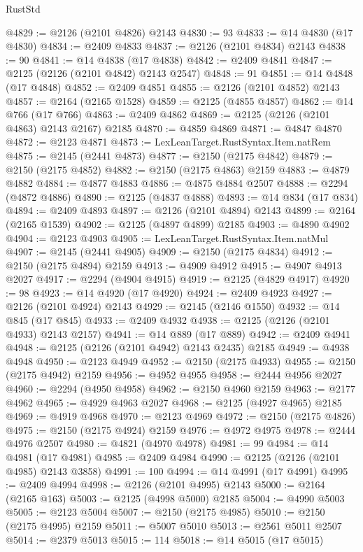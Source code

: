 \begin{lexlean}{RustStd}
\begin{coremodule}
@4829 := @2126 (@2101 @4826) @2143
@4830 := 93
@4833 := @14 @4830 (@17 @4830)
@4834 := @2409 @4833
@4837 := @2126 (@2101 @4834) @2143
@4838 := 90
@4841 := @14 @4838 (@17 @4838)
@4842 := @2409 @4841
@4847 := @2125 (@2126 (@2101 @4842) @2143 @2547)
@4848 := 91
@4851 := @14 @4848 (@17 @4848)
@4852 := @2409 @4851
@4855 := @2126 (@2101 @4852) @2143
@4857 := @2164 (@2165 @1528)
@4859 := @2125 (@4855 @4857)
@4862 := @14 @766 (@17 @766)
@4863 := @2409 @4862
@4869 := @2125 (@2126 (@2101 @4863) @2143 @2167) @2185
@4870 := @4859 @4869
@4871 := @4847 @4870
@4872 := @2123 @4871
@4873 := LexLeanTarget.RustSyntax.Item.natRem
@4875 := @2145 (@2441 @4873)
@4877 := @2150 (@2175 @4842)
@4879 := @2150 (@2175 @4852)
@4882 := @2150 (@2175 @4863) @2159
@4883 := @4879 @4882
@4884 := @4877 @4883
@4886 := @4875 @4884 @2507
@4888 := @2294 (@4872 @4886)
@4890 := @2125 (@4837 @4888)
@4893 := @14 @834 (@17 @834)
@4894 := @2409 @4893
@4897 := @2126 (@2101 @4894) @2143
@4899 := @2164 (@2165 @1539)
@4902 := @2125 (@4897 @4899) @2185
@4903 := @4890 @4902
@4904 := @2123 @4903
@4905 := LexLeanTarget.RustSyntax.Item.natMul
@4907 := @2145 (@2441 @4905)
@4909 := @2150 (@2175 @4834)
@4912 := @2150 (@2175 @4894) @2159
@4913 := @4909 @4912
@4915 := @4907 @4913 @2027
@4917 := @2294 (@4904 @4915)
@4919 := @2125 (@4829 @4917)
@4920 := 98
@4923 := @14 @4920 (@17 @4920)
@4924 := @2409 @4923
@4927 := @2126 (@2101 @4924) @2143
@4929 := @2145 (@2146 @1550)
@4932 := @14 @845 (@17 @845)
@4933 := @2409 @4932
@4938 := @2125 (@2126 (@2101 @4933) @2143 @2157)
@4941 := @14 @889 (@17 @889)
@4942 := @2409 @4941
@4948 := @2125 (@2126 (@2101 @4942) @2143 @2435) @2185
@4949 := @4938 @4948
@4950 := @2123 @4949
@4952 := @2150 (@2175 @4933)
@4955 := @2150 (@2175 @4942) @2159
@4956 := @4952 @4955
@4958 := @2444 @4956 @2027
@4960 := @2294 (@4950 @4958)
@4962 := @2150 @4960 @2159
@4963 := @2177 @4962
@4965 := @4929 @4963 @2027
@4968 := @2125 (@4927 @4965) @2185
@4969 := @4919 @4968
@4970 := @2123 @4969
@4972 := @2150 (@2175 @4826)
@4975 := @2150 (@2175 @4924) @2159
@4976 := @4972 @4975
@4978 := @2444 @4976 @2507
@4980 := @4821 (@4970 @4978)
@4981 := 99
@4984 := @14 @4981 (@17 @4981)
@4985 := @2409 @4984
@4990 := @2125 (@2126 (@2101 @4985) @2143 @3858)
@4991 := 100
@4994 := @14 @4991 (@17 @4991)
@4995 := @2409 @4994
@4998 := @2126 (@2101 @4995) @2143
@5000 := @2164 (@2165 @163)
@5003 := @2125 (@4998 @5000) @2185
@5004 := @4990 @5003
@5005 := @2123 @5004
@5007 := @2150 (@2175 @4985)
@5010 := @2150 (@2175 @4995) @2159
@5011 := @5007 @5010
@5013 := @2561 @5011 @2507
@5014 := @2379 @5013
@5015 := 114
@5018 := @14 @5015 (@17 @5015)

\end{coremodule}
\end{lexlean}
